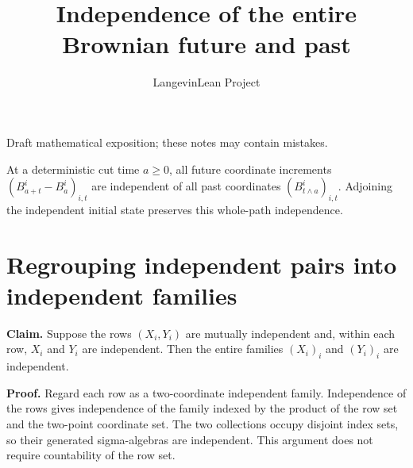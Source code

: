 \documentclass[11pt,a4paper]{article}
\title{\texorpdfstring{Independence of the entire Brownian future and past}{Independence of the entire Brownian future and past}}
\author{LangevinLean Project}
\date{}
\begin{document}
\maketitle
Draft mathematical exposition; these notes may contain mistakes.


At a deterministic cut time \(a\ge0\), all future coordinate increments \((B^i_{a+t}-B^i_a)_{i,t}\) are independent of all past coordinates \((B^i_{t\wedge a})_{i,t}\). Adjoining the independent initial state preserves this whole-path independence.


\section{\texorpdfstring{Regrouping independent pairs into independent families}{Regrouping independent pairs into independent families}}


\textbf{Claim.} Suppose the rows \((X_i,Y_i)\) are mutually independent and, within each row, \(X_i\) and \(Y_i\) are independent. Then the entire families \((X_i)_i\) and \((Y_i)_i\) are independent.



\textbf{Proof.} Regard each row as a two-coordinate independent family. Independence of the rows gives independence of the family indexed by the product of the row set and the two-point coordinate set. The two collections occupy disjoint index sets, so their generated sigma-algebras are independent. This argument does not require countability of the row set.
\end{document}
